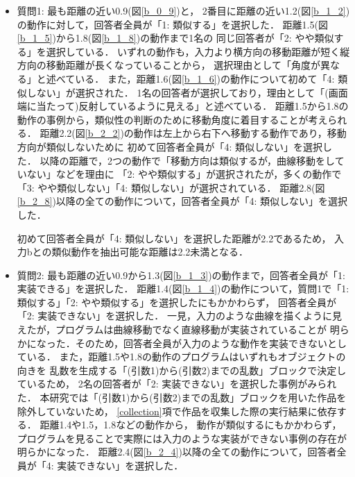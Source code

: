 \documentclass[11pt]{jreport}
\begin{document}
\begin{itemize}
    \item 質問1: 最も距離の近い0.9(図\ref{b_0_9})と，
    2番目に距離の近い1.2(図\ref{b_1_2})の動作に対して，回答者全員が「1: 類似する」を選択した．
    距離1.5(図\ref{b_1_5})から1.8(図\ref{b_1_8})の動作まで1名の
    同じ回答者が「2: やや類似する」を選択している．
    いずれの動作も，入力より横方向の移動距離が短く縦方向の移動距離が長くなっていることから，
    選択理由として「角度が異なる」と述べている．
    また，距離1.6(図\ref{b_1_6})の動作について初めて「4: 類似しない」が選択された．
    1名の回答者が選択しており，理由として「(画面端に当たって)反射しているように見える」と述べている．
    距離1.5から1.8の動作の事例から，類似性の判断のために移動角度に着目することが考えられる．
    距離2.2(図\ref{b_2_2})の動作は左上から右下へ移動する動作であり，移動方向が類似しないために
    初めて回答者全員が「4: 類似しない」を選択した．
    以降の距離で，2つの動作で「移動方向は類似するが，曲線移動をしていない」などを理由に
    「2: やや類似する」が選択されたが，多くの動作で「3: やや類似しない」「4: 類似しない」が選択されている．
    距離2.8(図\ref{b_2_8})以降の全ての動作について，回答者全員が「4: 類似しない」を選択した．
    
    初めて回答者全員が「4: 類似しない」を選択した距離が2.2であるため，
    入力bとの類似動作を抽出可能な距離は2.2未満となる．
    
    \item 質問2: 最も距離の近い0.9から1.3(図\ref{b_1_3})の動作まで，回答者全員が「1: 実装できる」を選択した．
    距離1.4(図\ref{b_1_4})の動作について，質問1で「1: 類似する」「2: やや類似する」を選択したにもかかわらず，
    回答者全員が「2: 実装できない」を選択した．
    一見，入力のような曲線を描くように見えたが，プログラムは曲線移動でなく直線移動が実装されていることが
    明らかになった．そのため，回答者全員が入力のような動作を実装できないとしている．
    また，距離1.5や1.8の動作のプログラムはいずれもオブジェクトの向きを
    乱数を生成する「(引数1)から(引数2)までの乱数」ブロックで決定しているため，
    2名の回答者が「2: 実装できない」を選択した事例がみられた．
    本研究では「(引数1)から(引数2)までの乱数」ブロックを用いた作品を除外していないため，
    \ref{collection}項で作品を収集した際の実行結果に依存する．
    距離1.4や1.5，1.8などの動作から，
    動作が類似するにもかかわらず，プログラムを見ることで実際には入力のような実装ができない事例の存在が
    明らかになった．
    距離2.4(図\ref{b_2_4})以降の全ての動作について，回答者全員が「4: 実装できない」を選択した．
\end{itemize}    
    
\end{document}
